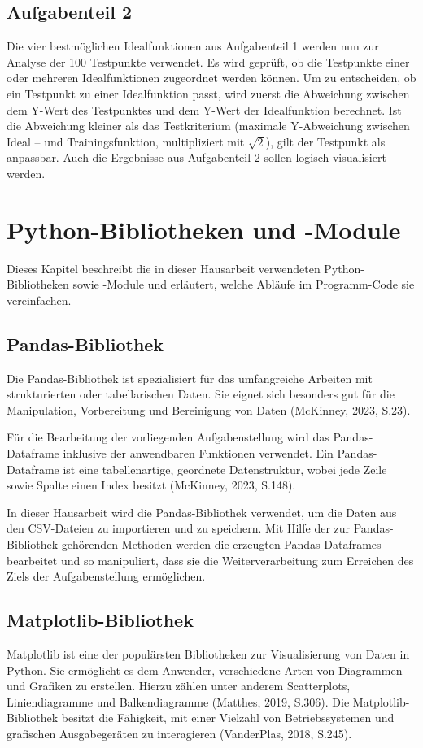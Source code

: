 \documentclass[
    a4paper, 								%
    oneside, 								%
    11pt, 									%
    listof=totoc, 					%
    bibliography=totoc, 		%
    final, 									%
    numbers=noenddot
]{scrreprt}
\begin{document}
\section{Aufgabenteil 2}
\label{sec:Aufgabenteil2}
Die vier bestmöglichen Idealfunktionen aus Aufgabenteil 1 werden nun zur Analyse der 100 Testpunkte verwendet. Es wird geprüft, ob die Testpunkte einer oder mehreren Idealfunktionen zugeordnet werden können. Um zu entscheiden, ob ein Testpunkt zu einer Idealfunktion passt, wird zuerst die Abweichung zwischen dem Y-Wert des Testpunktes und dem Y-Wert der Idealfunktion berechnet. Ist die Abweichung kleiner als das Testkriterium (maximale Y-Abweichung zwischen Ideal – und Trainingsfunktion, multipliziert mit $\sqrt{2}$), gilt der Testpunkt als anpassbar. Auch die Ergebnisse aus Aufgabenteil 2 sollen logisch visualisiert werden. 

\chapter{Python-Bibliotheken und -Module}
Dieses Kapitel beschreibt die in dieser Hausarbeit verwendeten Python-Bibliotheken sowie -Module und erläutert, welche Abläufe im Programm-Code sie vereinfachen.
\section{Pandas-Bibliothek}
\label{sec:Pandas}
Die Pandas-Bibliothek ist spezialisiert für das umfangreiche Arbeiten mit strukturierten oder tabellarischen Daten. Sie eignet sich besonders gut für die Manipulation, Vorbereitung und Bereinigung von Daten (McKinney, 2023, S.23).

Für die Bearbeitung der vorliegenden Aufgabenstellung wird das Pandas-Dataframe inklusive der anwendbaren Funktionen verwendet. Ein Pandas-Dataframe ist eine tabellenartige, geordnete Datenstruktur, wobei jede Zeile sowie Spalte einen Index besitzt (McKinney, 2023, S.148).

In dieser Hausarbeit wird die Pandas-Bibliothek verwendet, um die Daten aus den CSV-Dateien zu importieren und zu speichern. Mit Hilfe der zur Pandas-Bibliothek gehörenden Methoden werden die erzeugten Pandas-Dataframes bearbeitet und so manipuliert, dass sie die Weiterverarbeitung zum Erreichen des Ziels der Aufgabenstellung ermöglichen. 
\section{Matplotlib-Bibliothek}
Matplotlib ist eine der populärsten Bibliotheken zur Visualisierung von Daten in Python. Sie ermöglicht es dem Anwender, verschiedene Arten von Diagrammen und Grafiken zu erstellen. Hierzu zählen unter anderem Scatterplots, Liniendiagramme und Balkendiagramme (Matthes, 2019, S.306). Die Matplotlib-Bibliothek besitzt die Fähigkeit, mit einer Vielzahl von Betriebssystemen und grafischen Ausgabegeräten zu interagieren (VanderPlas, 2018, S.245).
\end{document}
